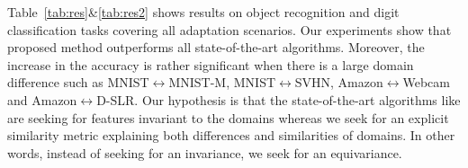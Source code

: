 \begin{table}
\vspace{-4mm}
\setlength{\tabcolsep}{3pt}
\caption{Accuracy on the digit classification task.}
\vspace{-2mm}
\label{tab:res2}
\begin{sc}
\begin{small}
\end{small}
\end{sc}
\vspace{-5mm}
\end{table}

Table~\ref{tab:res}\&\ref{tab:res2} shows results on object recognition and digit classification tasks covering all adaptation scenarios. Our experiments show that proposed method outperforms all state-of-the-art algorithms. Moreover, the increase in the accuracy is rather significant when there is a large domain difference such as MNIST$\leftrightarrow$MNIST-M, MNIST$\leftrightarrow$SVHN, Amazon$\leftrightarrow$Webcam and Amazon$\leftrightarrow$D-SLR. Our hypothesis is that the state-of-the-art algorithms like \cite{ganin15} are seeking for features invariant to the domains whereas we seek for an explicit similarity metric explaining both differences and similarities of domains. In other words, instead of seeking for an invariance, we seek for an equivariance. %




